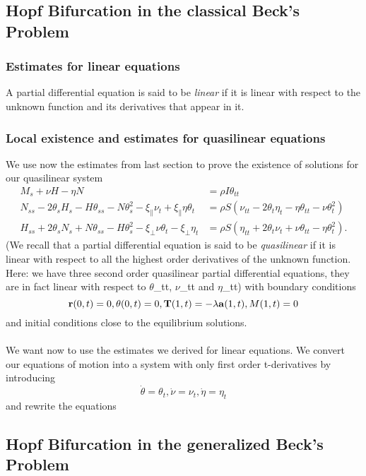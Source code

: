 
\subsection{Hopf Bifurcation in the classical Beck's Problem}
\subsubsection{Estimates for linear equations}
A partial differential equation is said to be \emph{linear} if it is linear with respect to the unknown function and its derivatives that appear in it.
\subsubsection{Local existence and estimates for quasilinear equations}
We use now the estimates from last section to prove the existence of solutions for our quasilinear system
\[
\begin{align}
M_s + \nu H -\eta N 
&= \rho I \theta_{tt}\\
N_{ss} - 2\theta_sH_s - H\theta_{ss}- N\theta_s^2 
- \xi_{\parallel}\nu_t + \xi_{\parallel}\eta\theta_t
&= \rho S (\nu_{tt} - 2 \theta_t\eta_t - \eta\theta_{tt} - \nu\theta_t^2)\\
H_{ss} + 2\theta_sN_s + N\theta_{ss} - H\theta_s^2 
- \xi_{\perp}\nu\theta_t - \xi_{\perp}\eta_t
&= \rho S (\eta_{tt} + 2\theta_t\nu_t + \nu\theta_{tt} - \eta\theta_t^2).
\end{align}
\]
(We recall that a partial differential equation is said to be \emph{quasilinear} if it is linear with respect to all the highest order derivatives of the unknown function. Here: we have three second order quasilinear partial differential equations, they are in fact linear with respect to $\theta$_{tt}, $\nu$_{tt} and $\eta$_{tt})
with boundary conditions
\[
\mathbf{r}(0,t)= 0,\\
\theta(0,t) = 0,\\
\mathbf{T}(1,t) = -\lambda \mathbf{a}(1,t),\\
M(1,t) = 0\\
\]
and initial conditions close to the equilibrium solutions.
\\\\
We want now to use the estimates we derived for linear equations. We convert our equations of motion into a system with only first order t-derivatives by introducing
\[
\dot\theta = \theta_t, \dot\nu = \nu_t, \dot\eta = \eta_t
\]
and rewrite the equations 
\[
\]




\subsection{Hopf Bifurcation in the generalized Beck's Problem}

